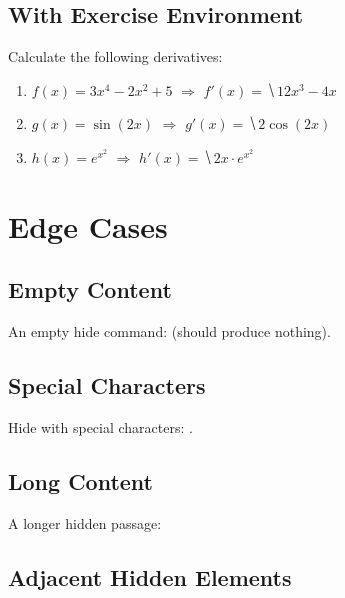 \documentclass[11pt,a4paper]{article}
\begin{document}
\subsection{With Exercise Environment}

\begin{exauto}[Derivatives][1]
  Calculate the following derivatives:
  \begin{enumerate}
    \item $f(x) = 3x^4 - 2x^2 + 5$ \quad $\Rightarrow$ \quad $f'(x) = \hide{12x^3 - 4x}$
    \item $g(x) = \sin(2x)$ \quad $\Rightarrow$ \quad $g'(x) = \hide{2\cos(2x)}$
    \item $h(x) = e^{x^2}$ \quad $\Rightarrow$ \quad $h'(x) = \hide{2x \cdot e^{x^2}}$
  \end{enumerate}
\end{exauto}

\section{Edge Cases}

\subsection{Empty Content}

An empty hide command: \hide{} (should produce nothing).

\subsection{Special Characters}

Hide with special characters: .

\subsection{Long Content}

A longer hidden passage: 

\subsection{Adjacent Hidden Elements}
\end{document}

